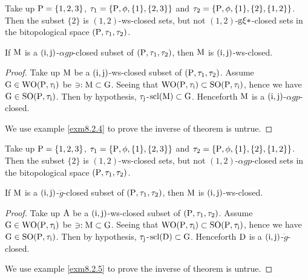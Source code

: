 \begin{exm}\label{exm8.2.3} 
Take up $\mathrm{P}= \{1,2,3\}$, $\tau_1 =\{\mathrm{P}, \phi, \{1\}, \{2,3\}\}$ and $\tau_2 =\{\TSP, \phi, \{1\},\break \{2\}, \{1, 2\}\}$. Then the subset $\{2\}$ is $(1, 2)$-ws-closed sets, but not $(1, 2)$-$\mathrm{g}\xi*$-closed sets in the bitopological space $(\mathrm{P}, \tau_1, \tau_2 )$.
\end{exm}

\begin{thm}\label{thm8.2.4}
If $\mathrm{M}$ is a $(\mathrm{i}, \mathrm{j})$-$\alpha gp$-closed subset of $(\mathrm{P}, \tau_1, \tau_2)$, then $\mathrm{M}$ is $(\mathrm{i}, \mathrm{j})$-ws-closed.
\end{thm}

\begin{proof}
Take up $\mathrm{M}$ be a $(\mathrm{i}, \mathrm{j})$-ws-closed subset of $(\mathrm{P}, \tau_1, \tau_2)$. Assume $\mathrm{G}\in\mathrm{W}\mathrm{O}(\mathrm{P}, \tau_{\mathrm{i}})$ be $\ni: \mathrm{M} \subset \mathrm{G}$. Seeing that $\mathrm{W}\mathrm{O}(\mathrm{P}, \tau_{\mathrm{i}}) \subset \mathrm{S}\mathrm{O}(\mathrm{P}, \tau_{\mathrm{i}})$, hence we have $\mathrm{G}\in\mathrm{S}\mathrm{O}(\mathrm{P}, \tau_{\mathrm{i}})$. Then by hypothesis, $\tau_{\mathrm{j}}$-$
\mathrm{scl}(\mathrm{M}) \subset \mathrm{G}$. Henceforth $\mathrm{M}$ is a $(\mathrm{i}, \mathrm{j})$-$\alpha gp$-closed.

We use example \ref{exm8.2.4} to prove the inverse of theorem is untrue.
\end{proof}

\begin{exm}\label{exm8.2.4}
Take up $\mathrm{P}= \{1,2,3\}$, $\tau_1 =\{\mathrm{P}, \phi, \{1\}, \{2,3\}\}$ and $\tau_2 =\{\TSP, \phi, \{1\},\break \{2\}, \{1, 2\}\}$. Then the subset $\{2\}$ is $(1, 2)$-ws-closed sets, but not $(1, 2)$-$\alpha gp$-closed sets in the bitopological space $(\mathrm{P}, \tau_1, \tau_2 )$.
\end{exm}

\begin{thm}\label{thm8.2.5}
If $\mathrm{M}$ is a $(\mathrm{i}, \mathrm{j})$-$\ddot{g}$-closed subset of $(\mathrm{P}, \tau_1, \tau_2)$, then $\mathrm{M}$ is $(\mathrm{i}, \mathrm{j})$-ws-closed.
\end{thm}

\begin{proof}
Take up $\mathrm{A}$ be a $(\mathrm{i}, \mathrm{j})$-ws-closed subset of $(\mathrm{P}, \tau_1, \tau_2 )$. Assume $\mathrm{G}\in\mathrm{W}\mathrm{O}(\mathrm{P}, \tau_{\mathrm{i}} )$ be $\ni: \mathrm{M} \subset \mathrm{G}$. Seeing that $\mathrm{W}\mathrm{O}(\mathrm{P}, \tau_{\mathrm{i}} ) \subset \mathrm{S}\mathrm{O}(\mathrm{P}, \tau_{\mathrm{i}} )$, hence we have $\mathrm{G}\in\mathrm{S}\mathrm{O}(\mathrm{P}, \tau_{\mathrm{i}} )$. Then by hypothesis, $\tau_{\mathrm{j}}$-$\mathrm{scl}(\mathrm{D}) \subset \mathrm{G}$. Henceforth $\mathrm{D}$ is a $(\mathrm{i}, \mathrm{j})$-$\ddot{g}$-closed.

We use example \ref{exm8.2.5} to prove the inverse of theorem is untrue.
\end{proof}

